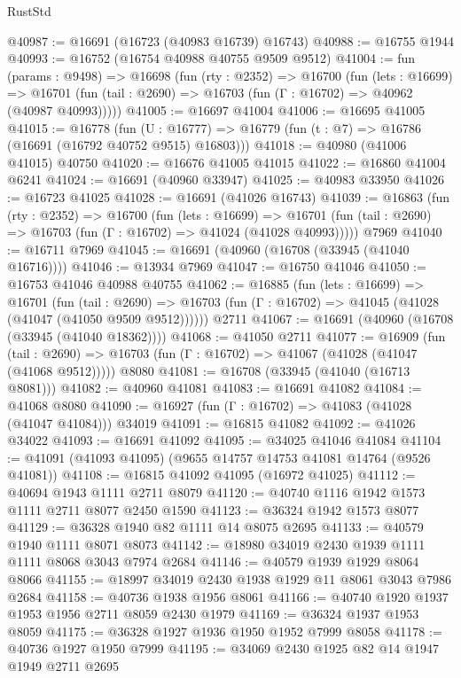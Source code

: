 \begin{lexlean}{RustStd}
\begin{coremodule}
@40987 := @16691 (@16723 (@40983 @16739) @16743)
@40988 := @16755 @1944
@40993 := @16752 (@16754 @40988 @40755 @9509 @9512)
@41004 := fun (params : @9498) =>
  @16698
    (fun (rty : @2352) =>
    @16700
      (fun (lets : @16699) =>
      @16701 (fun (tail : @2690) => @16703 (fun (Γ : @16702) => @40962 (@40987 @40993)))))
@41005 := @16697 @41004
@41006 := @16695 @41005
@41015 := @16778
    (fun (U : @16777) => @16779 (fun (t : @7) => @16786 (@16691 (@16792 @40752 @9515) @16803)))
@41018 := @40980 (@41006 @41015) @40750
@41020 := @16676 @41005 @41015
@41022 := @16860 @41004 @6241
@41024 := @16691 (@40960 @33947)
@41025 := @40983 @33950
@41026 := @16723 @41025
@41028 := @16691 (@41026 @16743)
@41039 := @16863
    (fun (rty : @2352) =>
    @16700
      (fun (lets : @16699) =>
      @16701 (fun (tail : @2690) => @16703 (fun (Γ : @16702) => @41024 (@41028 @40993)))))
    @7969
@41040 := @16711 @7969
@41045 := @16691 (@40960 (@16708 (@33945 (@41040 @16716))))
@41046 := @13934 @7969
@41047 := @16750 @41046
@41050 := @16753 @41046 @40988 @40755
@41062 := @16885
    (fun (lets : @16699) =>
    @16701
      (fun (tail : @2690) =>
      @16703 (fun (Γ : @16702) => @41045 (@41028 (@41047 (@41050 @9509 @9512))))))
    @2711
@41067 := @16691 (@40960 (@16708 (@33945 (@41040 @18362))))
@41068 := @41050 @2711
@41077 := @16909
    (fun (tail : @2690) => @16703 (fun (Γ : @16702) => @41067 (@41028 (@41047 (@41068 @9512)))))
    @8080
@41081 := @16708 (@33945 (@41040 (@16713 @8081)))
@41082 := @40960 @41081
@41083 := @16691 @41082
@41084 := @41068 @8080
@41090 := @16927 (fun (Γ : @16702) => @41083 (@41028 (@41047 @41084))) @34019
@41091 := @16815 @41082
@41092 := @41026 @34022
@41093 := @16691 @41092
@41095 := @34025 @41046 @41084
@41104 := @41091 (@41093 @41095) (@9655 @14757 @14753 @41081 @14764 (@9526 @41081))
@41108 := @16815 @41092 @41095 (@16972 @41025)
@41112 := @40694 @1943 @1111 @2711 @8079
@41120 := @40740 @1116 @1942 @1573 @1111 @2711 @8077 @2450 @1590
@41123 := @36324 @1942 @1573 @8077
@41129 := @36328 @1940 @82 @1111 @14 @8075 @2695
@41133 := @40579 @1940 @1111 @8071 @8073
@41142 := @18980 @34019 @2430 @1939 @1111 @1111 @8068 @3043 @7974 @2684
@41146 := @40579 @1939 @1929 @8064 @8066
@41155 := @18997 @34019 @2430 @1938 @1929 @11 @8061 @3043 @7986 @2684
@41158 := @40736 @1938 @1956 @8061
@41166 := @40740 @1920 @1937 @1953 @1956 @2711 @8059 @2430 @1979
@41169 := @36324 @1937 @1953 @8059
@41175 := @36328 @1927 @1936 @1950 @1952 @7999 @8058
@41178 := @40736 @1927 @1950 @7999
@41195 := @34069
    @2430
    @1925
    @82
    @14
    @1947
    @1949
    @2711
    @2695

\end{coremodule}
\end{lexlean}
